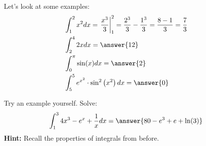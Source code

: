 \documentclass{ximera}
\begin{document}
\begin{example}\label{example:13-2}
Let's look at some examples:
\[
\begin{aligned}
& \int_{1}^{2} x^{2} d x=\left.\frac{x^{3}}{3}\right|_{1} ^{2}=\frac{2^{3}}{3}-\frac{1^{3}}{3}=\frac{8-1}{3}=\frac{7}{3} \\
& \int_{2}^{4} 2 x d x=\answer{12} \\
& \int_{0}^{\pi} \sin (x) d x=\answer{2} \\
& \int_{5}^{5} e^{x^{2}} \cdot \sin ^{2}\left(x^{2}\right) d x=\answer{0}
\end{aligned}
\]
\end{example}

\begin{exercise}\label{exercise:13-3}
Try an example yourself. Solve:
\[
\int_{1}^{3} 4 x^{3}-e^{x}+\frac{1}{x} d x=\answer{80-e^{3}+e+\ln(3)}
\]
\textbf{Hint:} Recall the properties of integrals from before.
\end{exercise}
\end{document}
